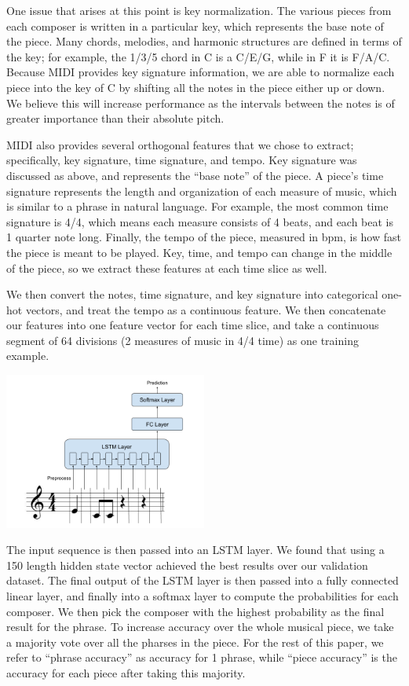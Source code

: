\documentclass[11pt,a4paper]{article}
\begin{document}
One issue that arises at this point is key normalization. The various pieces from each composer is written in a particular key, which represents the base note of the piece. Many chords, melodies, and harmonic structures are defined in terms of the key; for example, the 1/3/5 chord in C is a C/E/G, while in F it is F/A/C. Because MIDI provides key signature information, we are able to normalize each piece into the key of C by shifting all the notes in the piece either up or down. We believe this will increase performance as the intervals between the notes is of greater importance than their absolute pitch.

MIDI also provides several orthogonal features that we chose to extract; specifically, key signature, time signature, and tempo. Key signature was discussed as above, and represents the ``base note'' of the piece. A piece's time signature represents the length and organization of each measure of music, which is similar to a phrase in natural language. For example, the most common time signature is 4/4, which means each measure consists of 4 beats, and each beat is 1 quarter note long. Finally, the tempo of the piece, measured in bpm, is how fast the piece is meant to be played. Key, time, and tempo can change in the middle of the piece, so we extract these features at each time slice as well.

We then convert the notes, time signature, and key signature into categorical one-hot vectors, and treat the tempo as a continuous feature. We then concatenate our features into one feature vector for each time slice, and take a continuous segment of 64 divisions (2 measures of music in 4/4 time) as one training example.

\includegraphics[width=0.5\textwidth]{Architecture.png}

The input sequence is then passed into an LSTM layer. We found that using a 150 length hidden state vector achieved the best results over our validation dataset. The final output of the LSTM layer is then passed into a fully connected linear layer, and finally into a softmax layer to compute the probabilities for each composer. We then pick the composer with the highest probability as the final result for the phrase. To increase accuracy over the whole musical piece, we take a majority vote over all the pharses in the piece. For the rest of this paper, we refer to ``phrase accuracy'' as accuracy for 1 phrase, while ``piece accuracy'' is the accuracy for each piece after taking this majority. 
\end{document}
